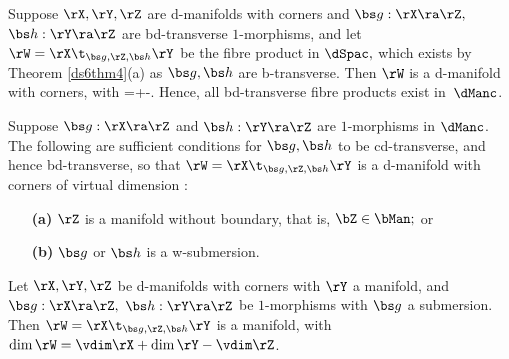 \documentclass{article}
\begin{document}
\begin{thm} Suppose\/ $\rX,\rY,\rZ$ are d-manifolds with corners
and\/ $\bs g:\rX\ra\rZ,$ $\bs h:\rY\ra\rZ$ are bd-transverse
$1$-morphisms, and let\/ $\rW=\rX\t_{\bs g,\rZ,\bs h}\rY$ be the
fibre product in $\dSpac,$ which exists by Theorem\/
{\rm\ref{ds6thm4}(a)} as $\bs g,\bs h$ are b-transverse. Then $\rW$
is a d-manifold with corners, with
\e
\vdim\rW=\vdim\rX+\vdim\rY-\vdim\rZ.
\label{ds7eq1}
\e
Hence, all bd-transverse fibre products exist in\/~$\dManc$.
\label{ds7thm7}
\end{thm}

\begin{thm} Suppose\/ $\bs g:\rX\ra\rZ$ and\/ $\bs h:\rY\ra\rZ$ are
$1$-morphisms in $\dManc$. The following are sufficient conditions
for $\bs g,\bs h$ to be cd-transverse, and hence bd-transverse, so
that\/ $\rW=\rX\t_{\bs g,\rZ,\bs h}\rY$ is a d-manifold with corners
of virtual dimension\/ {\rm{}:}
\begin{itemize}
\setlength{\itemsep}{0pt}
\setlength{\parsep}{0pt}
\item[{\bf(a)}] $\rZ$ is a manifold without boundary, that is,
$\bZ\in\bMan;$ or
\item[{\bf(b)}] $\bs g$ or $\bs h$ is a
w-submersion.
\end{itemize}
\label{ds7thm8}
\end{thm}

\begin{thm} Let\/ $\rX,\rY,\rZ$ be d-manifolds with corners with\/
$\rY$ a manifold, and\/ $\bs g:\rX\ra\rZ,$ $\bs h:\rY\ra\rZ$ be
$1$-morphisms with\/ $\bs g$ a submersion. Then\/ $\rW=\rX\t_{\bs
g,\rZ,\bs h}\rY$ is a manifold,
with\/~$\dim\rW=\vdim\rX+\dim\rY-\vdim\rZ$.
\label{ds7thm9}
\end{thm}
\end{document}
